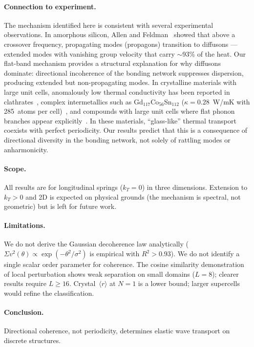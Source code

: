 \documentclass[12pt]{article}
\newcommand{\mr}{\langle r \rangle}
\newcommand{\svtwo}{\Sigma v^2}
\begin{document}
\paragraph{Connection to experiment.}
The mechanism identified here is consistent with several experimental
observations.  In amorphous silicon, Allen and Feldman~\cite{allen93,allen99}
showed that above a crossover frequency, propagating modes (propagons)
transition to diffusons --- extended modes with vanishing group velocity that
carry $\sim$93\% of the heat.  Our flat-band mechanism provides a structural
explanation for why diffusons dominate: directional incoherence of the bonding
network suppresses dispersion, producing extended but non-propagating modes.  In crystalline
materials with large unit cells, anomalously low thermal conductivity has been
reported in clathrates~\cite{takabatake14}, complex intermetallics such as
Gd$_{117}$Co$_{56}$Sn$_{112}$ ($\kappa = 0.28$~W/mK with 285~atoms per
cell)~\cite{schmitt12}, and
compounds with large unit cells where flat phonon branches appear
explicitly~\cite{cu26v2}.  In these materials, ``glass-like'' thermal
transport coexists with perfect periodicity.  Our results predict that this is
a consequence of directional diversity in the bonding network, not solely of
rattling modes or anharmonicity.

\paragraph{Scope.}
All results are for longitudinal springs ($k_T = 0$) in three dimensions.
Extension to $k_T > 0$ and 2D is expected on physical grounds (the mechanism
is spectral, not geometric) but is left for future work.

\paragraph{Limitations.}
We do not derive the Gaussian decoherence law analytically
($\svtwo(\theta) \propto \exp(-\theta^2/\sigma^2)$ is empirical with
$R^2 > 0.93$).  We do not identify a single scalar order parameter for
coherence.  The cosine similarity demonstration of local perturbation shows
weak separation on small domains ($L = 8$); clearer results require
$L \geq 16$.  Crystal~$\mr$ at $N = 1$ is a lower bound; larger supercells
would refine the classification.

\paragraph{Conclusion.}
Directional coherence, not periodicity, determines elastic wave transport on
discrete structures.
\end{document}
